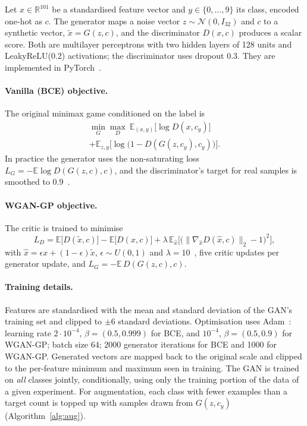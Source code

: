 \documentclass[conference]{IEEEtran}
\begin{document}
Let $x\in\mathbb{R}^{101}$ be a standardised feature vector and $y\in\{0,\dots,9\}$ its class, encoded one-hot as $c$.
The generator maps a noise vector $z\sim\mathcal{N}(0,I_{32})$ and $c$ to a synthetic vector,
$\tilde{x}=G(z,c)$, and the discriminator $D(x,c)$ produces a scalar score. Both are multilayer perceptrons with two
hidden layers of 128 units and LeakyReLU(0.2) activations; the discriminator uses dropout 0.3. They are implemented in
PyTorch~\cite{paszke2019}.

\paragraph{Vanilla (BCE) objective.} The original minimax game conditioned on the label is
\begin{multline}
\min_G\max_D\ \mathbb{E}_{(x,y)}\big[\log D(x,c_y)\big]\\
+\mathbb{E}_{z,y}\big[\log\big(1-D(G(z,c_y),c_y)\big)\big].
\end{multline}
In practice the generator uses the non-saturating loss $L_G=-\mathbb{E}\log D(G(z,c),c)$, and the discriminator's
target for real samples is smoothed to $0.9$~\cite{salimans2016}.

\paragraph{WGAN-GP objective.} The critic is trained to minimise
\begin{equation}
L_D=\mathbb{E}\big[D(\tilde{x},c)\big]-\mathbb{E}\big[D(x,c)\big]+\lambda\,\mathbb{E}_{\hat{x}}\Big[\big(\lVert\nabla_{\hat{x}}D(\hat{x},c)\rVert_2-1\big)^2\Big],
\end{equation}
with $\hat{x}=\epsilon x+(1-\epsilon)\tilde{x}$, $\epsilon\sim U(0,1)$ and $\lambda=10$~\cite{gulrajani2017}, five critic
updates per generator update, and $L_G=-\mathbb{E}\,D(G(z,c),c)$.

\paragraph{Training details.} Features are standardised with the mean and standard deviation of the GAN's training
set and clipped to $\pm 6$ standard deviations. Optimisation uses Adam~\cite{kingma2015}: learning rate $2\cdot10^{-4}$,
$\beta=(0.5,0.999)$ for BCE, and $10^{-4}$, $\beta=(0.5,0.9)$ for WGAN-GP; batch size 64; 2000 generator iterations for
BCE and 1000 for WGAN-GP. Generated vectors are mapped back to the original scale and clipped to the per-feature
minimum and maximum seen in training. The GAN is trained on \emph{all} classes jointly, conditionally, using only the
training portion of the data of a given experiment. For augmentation, each class with fewer examples than a target
count is topped up with samples drawn from $G(z,c_y)$ (Algorithm~\ref{alg:aug}).
\end{document}
